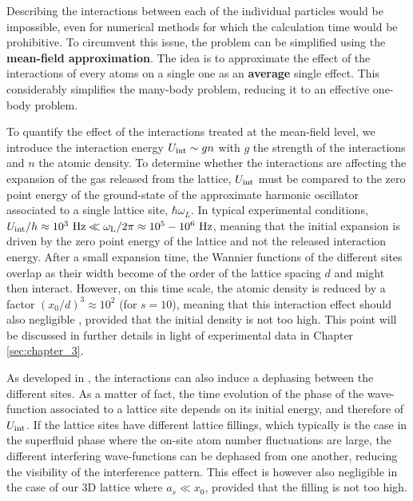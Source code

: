 Describing the interactions between each of the individual particles would be impossible, even for numerical methods for which the calculation time would be prohibitive. To circumvent this issue, the problem can be simplified using the \textbf{mean-field approximation}. The idea is to approximate the effect of the interactions of every atoms on a single one as an \textbf{average} single effect. This considerably simplifies the many-body problem, reducing it to an effective one-body problem.

To quantify the effect of the interactions treated at the mean-field level, we introduce the interaction energy $U_{\rm{int}} \sim gn$ with $g$ the strength of the interactions and $n$ the atomic density. To determine whether the interactions are affecting the expansion of the gas released from the lattice, $U_{\rm{int}}$ must be compared to the zero point energy of the ground-state of the approximate harmonic oscillator associated to a single lattice site, $\hbar \omega_L$. In typical experimental conditions, $U_{\rm{int}}/h \approx 10^3 \ \rm{Hz} \ll \omega_L/2 \pi \approx 10^5-10^6 \ \rm{Hz}$, meaning that the initial expansion is driven by the zero point energy of the lattice and not the released interaction energy. After a small expansion time, the Wannier functions of the different sites overlap as their width become of the order of the lattice spacing $d$ and might then interact. However, on this time scale, the atomic density is reduced by a factor $(x_0/d)^3 \approx 10^2$ (for $s=10$), meaning that this interaction effect should also negligible \cite{gerbier2008expansion}, provided that the initial density is not too high. This point will be discussed in further details in light of experimental data in Chapter \ref{sec:chapter_3}.

As developed in \cite{kupferschmidt2010role}, the interactions can also induce a dephasing between the different sites. As a matter of fact, the time evolution of the phase of the wave-function associated to a lattice site depends on its initial energy, and therefore of $U_{\rm{int}}$. If the lattice sites have different lattice fillings, which typically is the case in the superfluid phase where the on-site atom number fluctuations are large, the different interfering wave-functions can be dephased from one another, reducing the visibility of the interference pattern. This effect is however also negligible \cite{gerbier2008expansion,kupferschmidt2010role} in the case of our 3D lattice where $a_s \ll x_0$, provided that the filling is not too high.

